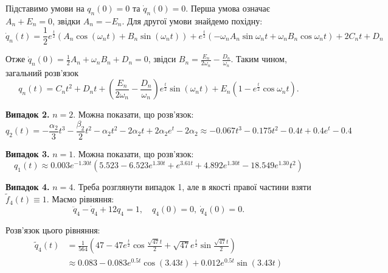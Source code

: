 \documentclass{hw_template}
\begin{document}
Підставимо умови на $q_n(0)=0$ та $\dot{q}_n(0)=0$. Перша умова означає $A_n + E_n = 0$, звідки $A_n=-E_n$. 
Для другої умови знайдемо похідну:
\begin{equation*}
    \dot{q}_n(t) = \frac{1}{2}e^{\frac{t}{2}}\left(A_n \cos\left(\omega_n t\right) + B_n \sin\left(\omega_n t\right)\right) + e^{\frac{t}{2}}\left(-\omega_n A_n \sin \omega_n t + \omega_n B_n \cos \omega_n t\right) + 2C_nt + D_n
\end{equation*}

Отже $\dot{q}_n(0) = \frac{1}{2}A_n + \omega_nB_n + D_n = 0$, звідси $B_n =
\frac{E_n}{2\omega_n} - \frac{D_n}{\omega_n}$. Таким чином, загальний розв'язок
\begin{equation*}
    q_n(t) = C_nt^2 + D_nt + \left(\frac{E_n}{2\omega_n} - \frac{D_n}{\omega_n}\right)e^{\frac{t}{2}}\sin\left(\omega_n t\right) + E_n(1-e^{\frac{t}{2}}\cos \omega_n t).
\end{equation*}

\textbf{Випадок 2.} $n=2$. Можна показати, що розв'язок:
\begin{equation*}
    q_2(t) = -\frac{\alpha_2}{3}t^3 - \frac{\beta_2}{2}t^2 - \alpha_2t^2 - 2\alpha_2t + 2\alpha_2e^t-2\alpha_2 \approx -0.067t^3 - 0.175t^2 - 0.4t + 0.4e^t - 0.4
\end{equation*}

\textbf{Випадок 3.} $n=1$. Можна показати, що розв'язок:
\begin{equation*}
    q_1(t) \approx 0.003e^{-1.30t}(5.523 - 6.523e^{1.30t} + e^{3.61t} + 4.892e^{1.30t} - 18.549e^{1.30}t^2)
\end{equation*}

\textbf{Випадок 4.} $n=4$. Треба розглянути випадок 1, але в якості правої
частини взяти $\widetilde{f}_4(t) \equiv 1$. Маємо рівняння:
\begin{equation*}
    \ddot{q}_4 - \dot{q}_4 + 12q_4 = 1, \quad q_4(0) = 0, \; \dot{q}_4(0) = 0.
\end{equation*}

Розв'язок цього рівняння:
\begin{align*}
    \widetilde{q}_4(t) &= \frac{1}{564}\left(47 -47e^{\frac{t}{2}}\cos \frac{\sqrt{47}t}{2} + \sqrt{47}e^{\frac{t}{2}} \sin \frac{\sqrt{47}t}{2}\right) \\
    &\approx 0.083 - 0.083e^{0.5t}\cos (3.43t) + 0.012e^{0.5t}\sin (3.43t)
\end{align*}
\end{document}
